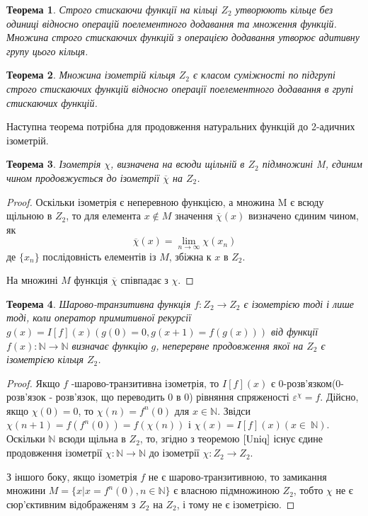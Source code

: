 \documentclass[a4paper,12pt]{article} \usepackage{a4wide}
\numberwithin{equation}{subsection}
\newtheorem{theorem}{Теорема}[subsection]
\begin{document}
\begin{theorem}Строго стискаючи функції на кільці $Z_2$ утворюють
  кільце без одиниці відносно операцій поелементного додавання та
  множення функцій. Множина строго стискаючих функцій з операцією
  додавання утворює адитивну групу цього кільця.
\end{theorem}
\begin{theorem} Множина ізометрій кільця $Z_2$ є класом суміжності по
  підгрупі строго стискаючих функцій відносно операції поелементного
  додавання в групі стискаючих функцій.
\end{theorem}
Наступна теорема потрібна для продовження натуральних функцій до
2-адичних ізометрій.
\begin{theorem} \label{Uniq} Ізометрія $\chi$, визначена на всюди
  щільній в $Z_2$ підмножині M, єдиним чином продовжується до
  ізометрії $\overline{\chi}$ на $Z_2$.
\end{theorem}
\begin{proof}
  Оскільки ізометрія є неперевною функцією, а множина M є всюду
  щільною в $Z_2$, то для елемента $x \notin M$ значення
  $\overline{\chi}(x)$ визначено єдиним чином, як $$\overline{\chi}(x)
  = \lim_{n\rightarrow \infty}\chi(x_n)$$ де $\{x_n\}$ послідовність
  елементів із $M$, збіжна к $x$ в $Z_2$.

  На множині $M$ функція $\overline{\chi}$ співпадає з $\chi$.
\end{proof}

\begin{theorem} Шарово-транзитивна функція $f:Z_2\rightarrow Z_2$ є
  ізометрією тоді і лише тоді, коли оператор примитивної рекурсії
  $g(x)=I[f](x) (g(0)=0, g(x+1) = f(g(x)))$ від функції $f(x):
  \mathbb{N}\rightarrow \mathbb{N}$ визначає функцію $g$, неперервне
  продовження якої на $Z_2$ є ізометрією кільця $Z_2$.
\end{theorem}
\begin{proof}
  Якщо $f$ -шарово-транзитивна ізометрія, то $I[f](x)$ є
  0-розв'язком(0-розв'язок - розв'язок, що переводить 0 в 0) рівняння
  спряженості $\varepsilon^{\chi}=f$. Дійсно, якщо $\chi(0)=0$, то
  $\chi(n)=f^n(0)$ для $x \in \mathbb{N}$. Звідси
  $\chi(n+1)=f(f^n(0))=f(\chi(n))$ і $\chi(x)=I[f](x)(x\in \
  \mathbb{N})$.  Оскільки $\mathbb{N}$ всюди щільна в $Z_2$, то,
  згідно з теоремою $\ref{Uniq}$ існує єдине продовження ізометрії
  $\chi:\mathbb{N}\rightarrow \mathbb{N}$ до ізометрії
  $\chi:Z_2\rightarrow Z_2$.

  З іншого боку, якщо ізометрія $f$ не є шарово-транзитивною, то
  замикання множини $M=\{x|x=f^n(0), n \in \mathbb{N}\}$ є власною
  підмножиною $Z_2$, тобто $\chi$ не є сюр'єктивним відображеням з
  $Z_2$ на $Z_2$, і тому не є ізометрією.
\end{proof}
\end{document}
